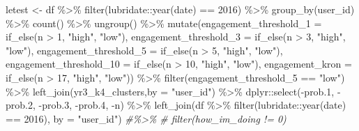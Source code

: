 \documentclass[
]{article}
\newenvironment{Shaded}{\begin{snugshade}}{\end{snugshade}}
\newcommand{\AttributeTok}[1]{\textcolor[rgb]{0.77,0.63,0.00}{#1}}
\newcommand{\CommentTok}[1]{\textcolor[rgb]{0.56,0.35,0.01}{\textit{#1}}}
\newcommand{\DecValTok}[1]{\textcolor[rgb]{0.00,0.00,0.81}{#1}}
\newcommand{\FloatTok}[1]{\textcolor[rgb]{0.00,0.00,0.81}{#1}}
\newcommand{\FunctionTok}[1]{\textcolor[rgb]{0.00,0.00,0.00}{#1}}
\newcommand{\NormalTok}[1]{#1}
\newcommand{\OtherTok}[1]{\textcolor[rgb]{0.56,0.35,0.01}{#1}}
\newcommand{\SpecialCharTok}[1]{\textcolor[rgb]{0.00,0.00,0.00}{#1}}
\newcommand{\StringTok}[1]{\textcolor[rgb]{0.31,0.60,0.02}{#1}}
\begin{document}
\begin{Shaded}
\begin{Highlighting}[]
\NormalTok{letest }\OtherTok{\textless{}{-}}\NormalTok{  df }\SpecialCharTok{\%\textgreater{}\%}
  \FunctionTok{filter}\NormalTok{(lubridate}\SpecialCharTok{::}\FunctionTok{year}\NormalTok{(date) }\SpecialCharTok{==} \DecValTok{2016}\NormalTok{) }\SpecialCharTok{\%\textgreater{}\%}
  \FunctionTok{group\_by}\NormalTok{(user\_id) }\SpecialCharTok{\%\textgreater{}\%}
  \FunctionTok{count}\NormalTok{() }\SpecialCharTok{\%\textgreater{}\%}
  \FunctionTok{ungroup}\NormalTok{() }\SpecialCharTok{\%\textgreater{}\%} 
  \FunctionTok{mutate}\NormalTok{(}\AttributeTok{engagement\_threshold\_1 =} \FunctionTok{if\_else}\NormalTok{(n }\SpecialCharTok{\textgreater{}} \DecValTok{1}\NormalTok{, }\StringTok{"high"}\NormalTok{, }\StringTok{"low"}\NormalTok{),}
         \AttributeTok{engagement\_threshold\_3 =} \FunctionTok{if\_else}\NormalTok{(n }\SpecialCharTok{\textgreater{}} \DecValTok{3}\NormalTok{, }\StringTok{"high"}\NormalTok{, }\StringTok{"low"}\NormalTok{),}
         \AttributeTok{engagement\_threshold\_5 =} \FunctionTok{if\_else}\NormalTok{(n }\SpecialCharTok{\textgreater{}} \DecValTok{5}\NormalTok{, }\StringTok{"high"}\NormalTok{, }\StringTok{"low"}\NormalTok{),}
         \AttributeTok{engagement\_threshold\_10 =} \FunctionTok{if\_else}\NormalTok{(n }\SpecialCharTok{\textgreater{}} \DecValTok{10}\NormalTok{, }\StringTok{"high"}\NormalTok{, }\StringTok{"low"}\NormalTok{),}
         \AttributeTok{engagement\_kron =} \FunctionTok{if\_else}\NormalTok{(n }\SpecialCharTok{\textgreater{}} \DecValTok{17}\NormalTok{, }\StringTok{"high"}\NormalTok{, }\StringTok{"low"}\NormalTok{)) }\SpecialCharTok{\%\textgreater{}\%} 
  \FunctionTok{filter}\NormalTok{(engagement\_threshold\_5 }\SpecialCharTok{==} \StringTok{"low"}\NormalTok{) }\SpecialCharTok{\%\textgreater{}\%} 
  \FunctionTok{left\_join}\NormalTok{(yr3\_k4\_clusters,}\AttributeTok{by =} \StringTok{"user\_id"}\NormalTok{) }\SpecialCharTok{\%\textgreater{}\%} 
\NormalTok{  dplyr}\SpecialCharTok{::}\FunctionTok{select}\NormalTok{(}\SpecialCharTok{{-}}\NormalTok{prob}\FloatTok{.1}\NormalTok{,}
          \SpecialCharTok{{-}}\NormalTok{prob}\FloatTok{.2}\NormalTok{,}
          \SpecialCharTok{{-}}\NormalTok{prob}\FloatTok{.3}\NormalTok{,}
          \SpecialCharTok{{-}}\NormalTok{prob}\FloatTok{.4}\NormalTok{,}
          \SpecialCharTok{{-}}\NormalTok{n) }\SpecialCharTok{\%\textgreater{}\%} 
  \FunctionTok{left\_join}\NormalTok{(df }\SpecialCharTok{\%\textgreater{}\%}
  \FunctionTok{filter}\NormalTok{(lubridate}\SpecialCharTok{::}\FunctionTok{year}\NormalTok{(date) }\SpecialCharTok{==} \DecValTok{2016}\NormalTok{),}
         \AttributeTok{by =} \StringTok{"user\_id"}\NormalTok{)}
\CommentTok{\#\%\textgreater{}\%}
\CommentTok{\#  filter(how\_im\_doing != 0)}



\end{Highlighting}
\end{Shaded}
\end{document}
